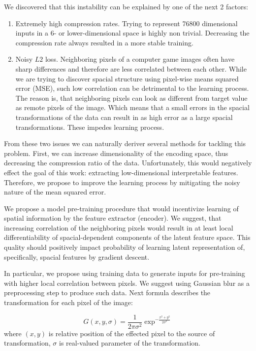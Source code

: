 We discovered that this instability can be explained by one of the next 2 factors:
\begin{enumerate}
  \item Extremely high compression rates. Trying to represent 76800 dimensional inputs in a 6- or lower-dimensional space is highly non trivial. Decreasing the compression rate always resulted in a more stable training.
  \item Noisy $L2$ loss. Neighboring pixels of a computer game images often have sharp differences and therefore are less correlated between each other.
  While we are trying to discover spacial structure using pixel-wise means squared error (MSE), such low correlation can be detrimental to the learning process.
  The reason is, that neighboring pixels can look as different from target value as remote pixels of the image.
  Which means that a small errors in the spacial transformations of the data can result in as high error as a large spacial transformations.
  These impedes learning process.
\end{enumerate}

From these two issues we can naturally deriver several methods for tackling this problem.
First, we can increase dimensionality of the encoding space, thus decreasing the compression ratio of the data.
Unfortunately, this would negatively effect the goal of this work: extracting low-dimensional interpretable features.
Therefore, we propose to improve the learning process by mitigating the noisy nature of the mean squared error.

We propose a model pre-training procedure that would incentivize learning of spatial information by the feature extractor (encoder).
We suggest, that increasing correlation of the neighboring pixels would result in at least local differentiability of spacial-dependent components of the latent feature space.
This quality should positively impact probability of learning latent representation of, specifically, spacial features by gradient descent.

In particular, we propose using training data to generate inputs for pre-training with higher local correlation between pixels.
We suggest using Gaussian blur as a preprocessing step to produce such data.
Next formula describes the transformation for each pixel of the image:

\begin{equation}
  G(x, y, \sigma) = \frac{1}{2\pi\sigma^2}\exp^{-\frac{x^2+y^2}{2\sigma^2}}
\end{equation}
where $(x, y)$ is relative position of the effected pixel to the source of transformation, $\sigma$ is real-valued parameter of the transformation.

